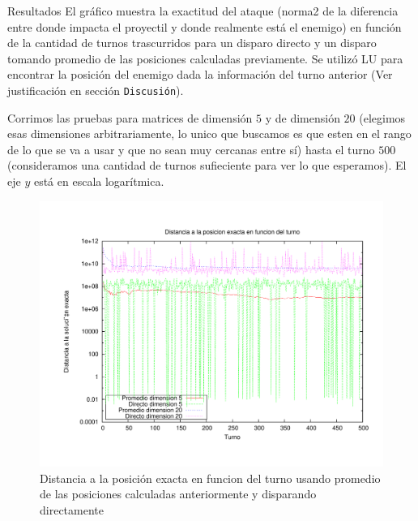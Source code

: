\begin{section}{Resultados}
	El gráfico muestra la exactitud del ataque (norma2 de la diferencia entre donde impacta el proyectil y donde realmente está el enemigo) en función de la cantidad de turnos trascurridos para un disparo directo y un disparo tomando promedio de las posiciones calculadas previamente.
	Se utilizó LU para encontrar la posición del enemigo dada la información del turno anterior (Ver justificación en sección \texttt{Discusión}).
	
	Corrimos las pruebas para matrices de dimensión $5$ y de dimensión $20$ (elegimos esas dimensiones arbitrariamente, lo unico que buscamos es que esten en el rango de lo que se va a usar y que no sean muy cercanas entre sí) hasta el turno $500$ (consideramos una cantidad de turnos sufieciente para ver lo que esperamos). El eje $y$ está en escala logarítmica.
	
	
	\begin{figure}[H]
	  \centering
		\includegraphics[width=14cm]{graficos/prom_vs_direct.pdf}
	  \caption{Distancia a la posición exacta en funcion del turno usando promedio de las posiciones calculadas anteriormente y disparando directamente}
	  \label{fig:prom_vs_direct}
	\end{figure}
	
	\VSP
\end{section}
